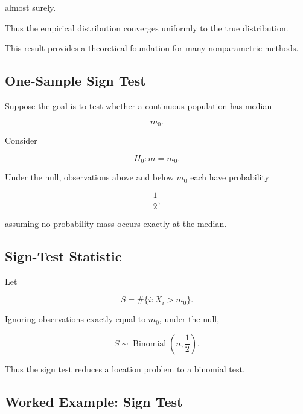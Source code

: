 almost surely.

Thus the empirical distribution converges uniformly to the true
distribution.

This result provides a theoretical foundation for many nonparametric
methods.

\subsection{One-Sample Sign Test}
\label{subsec:one-sample-sign-test}

Suppose the goal is to test whether a continuous population has median

\[
m_0.
\]

Consider

\[
H_0:
m=m_0.
\]

Under the null, observations above and below \(m_0\) each have probability

\[
\frac12,
\]

assuming no probability mass occurs exactly at the median.

\subsection{Sign-Test Statistic}
\label{subsec:sign-test-statistic}

Let

\[
S
=
\#\{i:X_i>m_0\}.
\]

Ignoring observations exactly equal to \(m_0\), under the null,

\[
\boxed{
S
\sim
\operatorname{Binomial}
\left(
n,\frac12
\right).
}
\]

Thus the sign test reduces a location problem to a binomial test.

\subsection{Worked Example: Sign Test}
\label{subsec:worked-sign-test}

